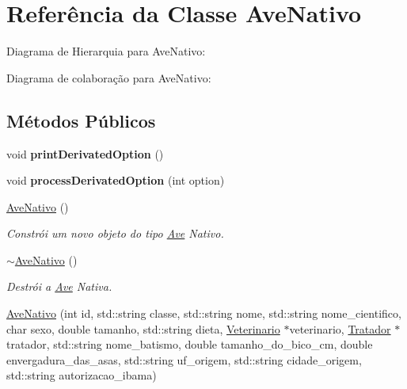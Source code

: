 \hypertarget{classAveNativo}{}\section{Referência da Classe Ave\+Nativo}
\label{classAveNativo}


Diagrama de Hierarquia para Ave\+Nativo\+:


Diagrama de colaboração para Ave\+Nativo\+:
\subsection*{Métodos Públicos}
\begin{DoxyCompactItemize}
\item 
\mbox{\label{classAveNativo_a220fa122c700bb7bd8ba42faf435f662}} 
void {\bfseries print\+Derivated\+Option} ()
\item 
\mbox{\label{classAveNativo_a666ddedd1e4aa3f6be5be72c032335fc}} 
void {\bfseries process\+Derivated\+Option} (int option)
\item 
\mbox{\label{classAveNativo_a3f84390deb367b29198c6fe20c020873}} 
\hyperlink{classAveNativo_a3f84390deb367b29198c6fe20c020873}{Ave\+Nativo} ()
\begin{DoxyCompactList}\small\item\em Constrói um novo objeto do tipo \hyperlink{classAve}{Ave} Nativo. \end{DoxyCompactList}\item 
\mbox{\label{classAveNativo_a3a1ebe2fd7ce2d879953868bc50f89a5}} 
\hyperlink{classAveNativo_a3a1ebe2fd7ce2d879953868bc50f89a5}{$\sim$\+Ave\+Nativo} ()
\begin{DoxyCompactList}\small\item\em Destrói a \hyperlink{classAve}{Ave} Nativa. \end{DoxyCompactList}\item 
\hyperlink{classAveNativo_a5a51d97043dbf61f0c6ed91076242a42}{Ave\+Nativo} (int id, std\+::string classe, std\+::string nome, std\+::string nome\+\_\+cientifico, char sexo, double tamanho, std\+::string dieta, \hyperlink{classVeterinario}{Veterinario} $\ast$veterinario, \hyperlink{classTratador}{Tratador} $\ast$tratador, std\+::string nome\+\_\+batismo, double tamanho\+\_\+do\+\_\+bico\+\_\+cm, double envergadura\+\_\+das\+\_\+asas, std\+::string uf\+\_\+origem, std\+::string cidade\+\_\+origem, std\+::string autorizacao\+\_\+ibama)

\end{DoxyCompactItemize}
